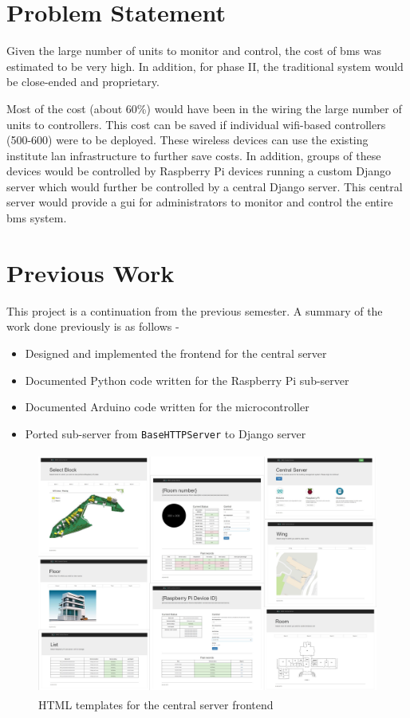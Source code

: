 \documentclass[letterpaper,11pt]{report}
\begin{document}
\newpage
\chapter{Problem Statement}\label{chapter:problemstatement}
\onehalfspacing
Given the large number of units to monitor and control, the cost of \ac{bms} was estimated to be very high. In addition, for phase II, the traditional system would be close-ended and proprietary.
\par
Most of the cost (about 60\%) would have been in the wiring the large number of units to controllers. This cost can be saved if individual \ac{wifi}-based controllers (500-600) were to be deployed. These wireless devices can use the existing institute \ac{lan} infrastructure to further save costs. In addition, groups of these devices would be controlled by Raspberry Pi devices running a custom Django server which would further be controlled by a central Django server. This central server would provide a \ac{gui} for administrators to monitor and control the entire \ac{bms} system.

\newpage
\chapter{Previous Work}\label{chapter:previouswork}
\onehalfspacing
This project is a continuation from the previous semester. A summary of the work done previously is as follows -
\begin{itemize}
    \item Designed and implemented the frontend for the central server
    \item Documented Python code written for the Raspberry Pi sub-server
    \item Documented Arduino code written for the microcontroller
    \item Ported sub-server from \verb|BaseHTTPServer| to Django server
\end{itemize}
\begin{figure}[h]
\includegraphics[width=12cm, height=8cm]{collage_edited}
\centering
\captionsetup{justification=centering}
\caption{HTML templates for the central server frontend}
\label{fig:collage_edited}
\end{figure}
\end{document}
